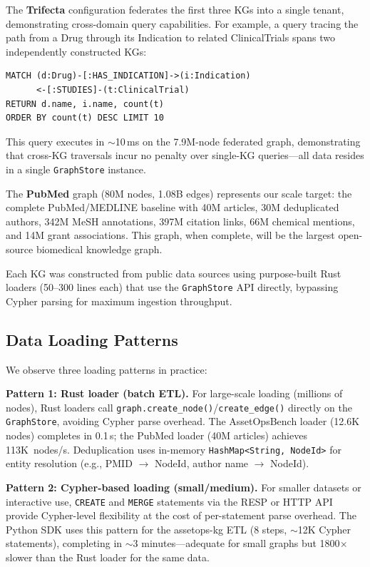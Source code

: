 \documentclass[sigconf, nonacm]{acmart}
\begin{document}
The \textbf{Trifecta} configuration federates the first three KGs into a single tenant, demonstrating cross-domain query capabilities.
For example, a query tracing the path from a Drug through its Indication to related ClinicalTrials spans two independently constructed KGs:

\begin{lstlisting}
MATCH (d:Drug)-[:HAS_INDICATION]->(i:Indication)
      <-[:STUDIES]-(t:ClinicalTrial)
RETURN d.name, i.name, count(t)
ORDER BY count(t) DESC LIMIT 10
\end{lstlisting}

\noindent
This query executes in ${\sim}$10\,ms on the 7.9M-node federated graph, demonstrating that cross-KG traversals incur no penalty over single-KG queries---all data resides in a single \texttt{GraphStore} instance.

The \textbf{PubMed} graph (80M nodes, 1.08B edges) represents our scale target: the complete PubMed/MEDLINE baseline with 40M articles, 30M deduplicated authors, 342M MeSH annotations, 397M citation links, 66M chemical mentions, and 14M grant associations.
This graph, when complete, will be the largest open-source biomedical knowledge graph.

Each KG was constructed from public data sources using purpose-built Rust loaders (50--300 lines each) that use the \texttt{GraphStore} API directly, bypassing Cypher parsing for maximum ingestion throughput.

\subsection{Data Loading Patterns}

We observe three loading patterns in practice:

\textbf{Pattern 1: Rust loader (batch ETL).}
For large-scale loading (millions of nodes), Rust loaders call \texttt{graph.create\_node()}/\texttt{create\_edge()} directly on the \texttt{GraphStore}, avoiding Cypher parse overhead.
The AssetOpsBench loader (12.6K nodes) completes in 0.1\,s; the PubMed loader (40M articles) achieves 113K~nodes/s.
Deduplication uses in-memory \texttt{HashMap<String, NodeId>} for entity resolution (e.g., PMID $\to$ NodeId, author name $\to$ NodeId).

\textbf{Pattern 2: Cypher-based loading (small/medium).}
For smaller datasets or interactive use, \texttt{CREATE} and \texttt{MERGE} statements via the RESP or HTTP API provide Cypher-level flexibility at the cost of per-statement parse overhead.
The Python SDK uses this pattern for the assetops-kg ETL (8 steps, ${\sim}$12K Cypher statements), completing in ${\sim}$3 minutes---adequate for small graphs but 1800$\times$ slower than the Rust loader for the same data.
\end{document}
